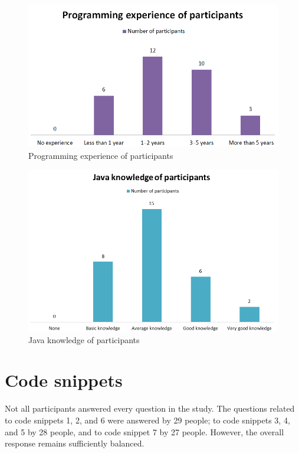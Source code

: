 \begin{figure} [H]
  \centering
  \includegraphics[scale=1]{figures/p_exp.png}
  \caption{Programming experience of participants}
  \label{fig:AnhangsChor}
\end{figure}


\begin{figure} [H]
  \centering
  \includegraphics[scale=1]{figures/java_kn.png}
  \caption{Java knowledge of participants}
  \label{fig:AnhangsChor}
\end{figure}


\section{Code snippets}
Not all participants answered every question in the study. The questions related to code snippets 1, 2, and 6 were answered by 29 people;  to code snippets 3, 4, and 5 by 28 people, and to code snippet 7 by 27 people.  However, the overall response remains sufficiently balanced.

